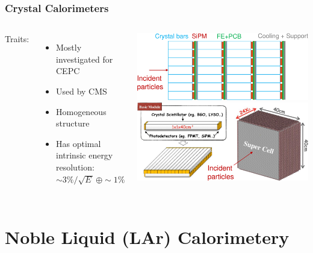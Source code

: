 \documentclass[aspectratio=169]{beamer}
\newcommand{\bluetext}[1]{%
  \textcolor{myBlue}{#1}
}
\begin{document}
\begin{frame}
  \frametitle{Crystal Calorimeters}

  \begin{columns}[c]
    \bluetext{Traits:}
    \begin{itemize}
      \item Mostly investigated for CEPC
      \item Used by CMS
      \item Homogeneous structure
      \item Has optimal intrinsic energy resolution:
            $\sim 3\%/\sqrt{E\,} \, \oplus \sim 1\%$
    \end{itemize}

    \includegraphics[width=\linewidth]{figures/CEPC_crystal_calo_design1.png}%
    \vspace{6ex}
    \includegraphics[width=\linewidth]{figures/CEPC_crystal_calo_design2.png}
  \end{columns}
\end{frame}

%
%
\section{Noble Liquid (LAr) Calorimetery}
\end{document}
